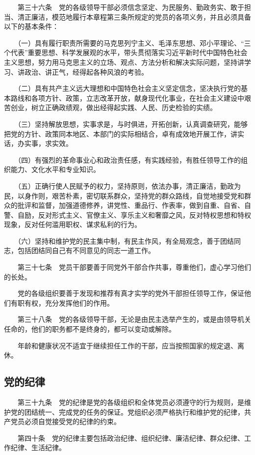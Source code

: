 　　第三十六条　党的各级领导干部必须信念坚定、为民服务、勤政务实、敢于担当、清正廉洁，模范地履行本章程第三条所规定的党员的各项义务，并且必须具备以下的基本条件：

　　（一）具有履行职责所需要的马克思列宁主义、毛泽东思想、邓小平理论、“三个代表”重要思想、科学发展观的水平，带头贯彻落实习近平新时代中国特色社会主义思想，努力用马克思主义的立场、观点、方法分析和解决实际问题，坚持讲学习、讲政治、讲正气，经得起各种风浪的考验。

　　（二）具有共产主义远大理想和中国特色社会主义坚定信念，坚决执行党的基本路线和各项方针、政策，立志改革开放，献身现代化事业，在社会主义建设中艰苦创业，树立正确政绩观，做出经得起实践、人民、历史检验的实绩。

　　（三）坚持解放思想，实事求是，与时俱进，开拓创新，认真调查研究，能够把党的方针、政策同本地区、本部门的实际相结合，卓有成效地开展工作，讲实话，办实事，求实效。

　　（四）有强烈的革命事业心和政治责任感，有实践经验，有胜任领导工作的组织能力、文化水平和专业知识。

　　（五）正确行使人民赋予的权力，坚持原则，依法办事，清正廉洁，勤政为民，以身作则，艰苦朴素，密切联系群众，坚持党的群众路线，自觉地接受党和群众的批评和监督，加强道德修养，讲党性、重品行、作表率，做到自重、自省、自警、自励，反对形式主义、官僚主义、享乐主义和奢靡之风，反对特权思想和特权现象，反对任何滥用职权、谋求私利的行为。

　　（六）坚持和维护党的民主集中制，有民主作风，有全局观念，善于团结同志，包括团结同自己有不同意见的同志一道工作。

　　第三十七条　党员干部要善于同党外干部合作共事，尊重他们，虚心学习他们的长处。

　　党的各级组织要善于发现和推荐有真才实学的党外干部担任领导工作，保证他们有职有权，充分发挥他们的作用。

　　第三十八条　党的各级领导干部，无论是由民主选举产生的，或是由领导机关任命的，他们的职务都不是终身的，都可以变动或解除。

　　年龄和健康状况不适宜于继续担任工作的干部，应当按照国家的规定退、离休。

    \subsection{党的纪律}
　　第三十九条　党的纪律是党的各级组织和全体党员必须遵守的行为规则，是维护党的团结统一、完成党的任务的保证。党组织必须严格执行和维护党的纪律，共产党员必须自觉接受党的纪律的约束。

　　第四十条　党的纪律主要包括政治纪律、组织纪律、廉洁纪律、群众纪律、工作纪律、生活纪律。

